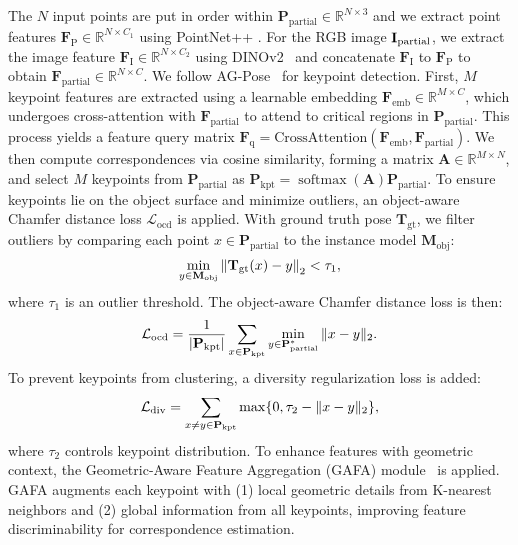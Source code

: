 The $N$ input points are put in order within $\mathbf{P}_{\text{partial}} \in \mathbb{R}^{N \times 3}$ and we extract point features $\mathbf{F}_{\text{P}} \in \mathbb{R}^{N \times C_1}$ using PointNet++ \cite{qi2017pointnetplusplus}. For the RGB image $\mathbf{I}_\text{\text{partial}}$, we extract the image feature $\mathbf{F}_{\text{I}} \in \mathbb{R}^{N \times C_2}$ using DINOv2~\cite{oquab2023dinov2} and concatenate $\mathbf{F}_{\text{I}}$ to $\mathbf{F}_{\text{P}}$ to obtain $\mathbf{F}_{\text{partial}} \in \mathbb{R}^{N \times C}$.
We follow AG-Pose~\cite{lin2024instance} for keypoint detection. First, $M$ keypoint features are extracted using a learnable embedding $\mathbf{F}_{\text{emb}} \in \mathbb{R}^{M \times C}$, which undergoes cross-attention with $\mathbf{F}_{\text {partial}}$ to attend to critical regions in $\mathbf{P}_{\text{partial}}$. This process yields a feature query matrix $\mathbf{F}_{\mathrm{q}} = \text{CrossAttention}(\mathbf{F}_{\text{emb}}, \mathbf{F}_{\text{partial}})$. We then compute correspondences via cosine similarity, forming a matrix $\mathbf{A} \in \mathbb{R}^{M \times N}$, and select $M$ keypoints from $\mathbf{P}_{\text{partial}}$ as $\mathbf{P}_{\mathrm{kpt}} = \operatorname{softmax}(\mathbf{A}) \mathbf{P}_{\text{partial}}$.
To ensure keypoints lie on the object surface and minimize outliers, an object-aware Chamfer distance loss \(\mathcal{L}_{\text{ocd}}\) is applied. With ground truth pose $\mathbf{T}_{\text{gt}}$, we filter outliers by comparing each point $x \in \mathbf{P}_{\text{partial}}$ to the instance model $\mathbf{M}_{\text{obj}}$:
\begin{equation}
\vspace{-0.2cm}
\min_{y \in \mathbf{M}_{\text{obj}}} \left\| \mathbf{T}_{\text{gt}}(x) - y \right\|_2 < {\tau_1},
\label{equ:outlier_threshold}
\end{equation}
where ${\tau_1}$ is an outlier threshold. The object-aware Chamfer distance loss is then:
\begin{equation}
\vspace{-0.2cm}
\mathcal{L}_{\text{ocd}} = \frac{1}{|\mathbf{P}_{\text{kpt}}|} \sum_{x \in \mathbf{P}_{\text{kpt}}} \min_{{y} \in \mathbf{P}_{\text{partial}}^*} \|{x} - {y}\|_2.
\vspace{-0.1cm}
\label{equ:ocd}
\end{equation}
To prevent keypoints from clustering, a diversity regularization loss is added:
\begin{equation}
\vspace{-0.1cm}
\mathcal{L}_{\text{div}} = \sum_{x \neq y \in \mathbf{P}_{\text{kpt}}} \max \{ 0, {\tau}_2 - \|x - y\|_2 \},
\vspace{-0.1cm}
\label{equ:div}
\end{equation}
where ${\tau}_2$ controls keypoint distribution.
To enhance features with geometric context, the Geometric-Aware Feature Aggregation (GAFA) module~\cite{lin2024instance} is applied. GAFA augments each keypoint with (1) local geometric details from K-nearest neighbors and (2) global information from all keypoints, improving feature discriminability for correspondence estimation.


